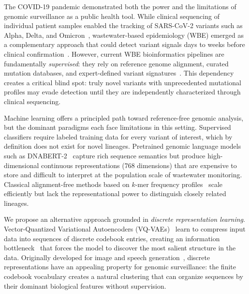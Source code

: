 \documentclass[pmlr]{jmlr}%
\begin{document}
The COVID-19 pandemic demonstrated both the power and the limitations of genomic surveillance as a public health tool. While clinical sequencing of individual patient samples enabled the tracking of SARS-CoV-2 variants such as Alpha, Delta, and Omicron~\citep{rambaut2020dynamic}, wastewater-based epidemiology (WBE) emerged as a complementary approach that could detect variant signals days to weeks before clinical confirmation~\citep{bibby2021making, wu2020sars}. However, current WBE bioinformatics pipelines are fundamentally \emph{supervised}: they rely on reference genome alignment, curated mutation databases, and expert-defined variant signatures~\citep{karthikeyan2022wastewater}. This dependency creates a critical blind spot: truly novel variants with unprecedented mutational profiles may evade detection until they are independently characterized through clinical sequencing.

Machine learning offers a principled path toward reference-free genomic analysis, but the dominant paradigms each face limitations in this setting. Supervised classifiers require labeled training data for every variant of interest, which by definition does not exist for novel lineages. Pretrained genomic language models such as DNABERT-2~\citep{zhou2023dnabert} capture rich sequence semantics but produce high-dimensional continuous representations (768 dimensions) that are expensive to store and difficult to interpret at the population scale of wastewater monitoring. Classical alignment-free methods based on $k$-mer frequency profiles~\citep{sims2009alignment} scale efficiently but lack the representational power to distinguish closely related lineages.

We propose an alternative approach grounded in \emph{discrete representation learning}. Vector-Quantized Variational Autoencoders (VQ-VAEs)~\citep{van2017neural} learn to compress input data into sequences of discrete codebook entries, creating an information bottleneck~\citep{tishby2000information} that forces the model to discover the most salient structure in the data. Originally developed for image and speech generation~\citep{razavi2019generating, baevski2020vq}, discrete representations have an appealing property for genomic surveillance: the finite codebook vocabulary creates a natural clustering that can organize sequences by their dominant biological features without supervision.
\end{document}
